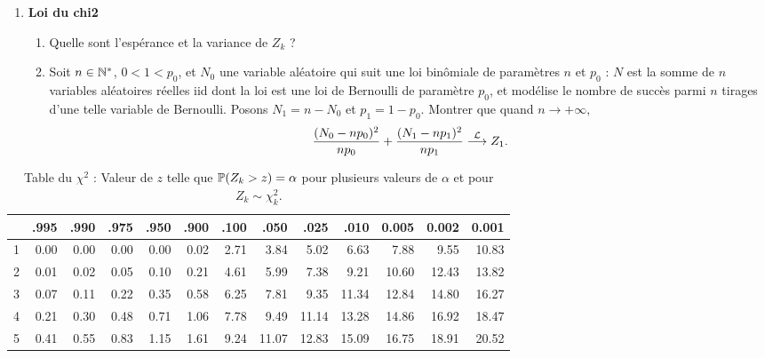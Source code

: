 \documentclass[french,11pt]{article}
\begin{document}
\begin{enumerate}[resume]
\item \textbf{Loi du chi2} \\
  \begin{enumerate}
  \item Quelle sont l'espérance et la variance de $Z_k$ ? 
  \item Soit $n \in \mathbb{N}^*$, $0 < 1 < p_0$, et $N_0$ une variable aléatoire qui
    suit une loi binômiale de paramètres $n$ et $p_0$ : $N$ est la somme de $n$
    variables aléatoires réelles iid dont la loi est une loi de Bernoulli de
    paramètre $p_0$, et modélise le nombre de succès parmi $n$ tirages d'une
    telle variable de Bernoulli. Posons $N_1 = n - N_0$ et $p_1 = 1 -
    p_0$. Montrer que quand $n \rightarrow +\infty,$ 
    \[
      \frac{(N_0 - n p_0)^2}{n p_0}  + \frac{(N_1 - n p_1)^2}{n p_1} \stackrel{\mathcal{L}}{\longrightarrow} Z_1.
    \]
  \end{enumerate}
\end{enumerate}

\begin{table}[h]
  \centering
  \begin{tabular}{|r|r|r|r|r|r|r|r|r|r|r|r|r|} \hline
      & .995 & .990 & .975 & .950 & .900 & .100 & .050  & .025  & .010 & 0.005 & 0.002 & 0.001 \\ \hline
    1 & 0.00 & 0.00 & 0.00 & 0.00 & 0.02 & 2.71 & 3.84  & 5.02  & 6.63 & 7.88 & 9.55 & 10.83 \\ \hline
    2 & 0.01 & 0.02 & 0.05 & 0.10 & 0.21 & 4.61 & 5.99  & 7.38  & 9.21 & 10.60 & 12.43 & 13.82 \\ \hline
    3 & 0.07 & 0.11 & 0.22 & 0.35 & 0.58 & 6.25 & 7.81  & 9.35  &  11.34 & 12.84 & 14.80 & 16.27 \\ \hline
    4 & 0.21 & 0.30 & 0.48 & 0.71 & 1.06 & 7.78 & 9.49  & 11.14 &  13.28 & 14.86 & 16.92 & 18.47 \\ \hline
    5 & 0.41 & 0.55 & 0.83 & 1.15 & 1.61 & 9.24 & 11.07 & 12.83 &  15.09 & 16.75 & 18.91 & 20.52 \\ \hline
  \end{tabular}
  \caption{Table du $\chi^2$ : Valeur de $z$ telle que $\mathbb{P}(Z_k > z) = \alpha$ pour 
    plusieurs valeurs de $\alpha$ et pour $Z_k \sim \chi^2_k$.}
  \label{tab:chi2}
\end{table}
\end{document}
